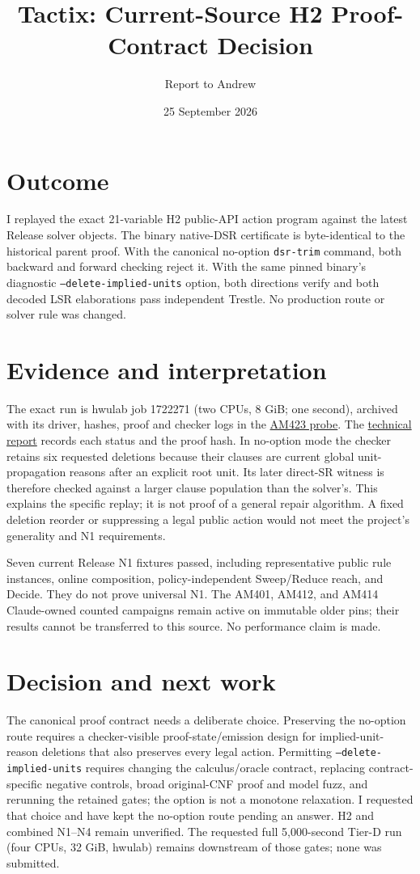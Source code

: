 \documentclass[11pt]{article}
\title{Tactix: Current-Source H2 Proof-Contract Decision}
\author{Report to Andrew}
\date{25 September 2026}
\begin{document}
\maketitle
\vspace{-1.5em}

\section*{Outcome}
I replayed the exact 21-variable H2 public-API action program against the
latest Release solver objects. The binary native-DSR certificate is
byte-identical to the historical parent proof. With the canonical no-option
\texttt{dsr-trim} command, both backward and forward checking reject it. With
the same pinned binary's diagnostic \texttt{--delete-implied-units} option,
both directions verify and both decoded LSR elaborations pass independent
Trestle. No production route or solver rule was changed.

\section*{Evidence and interpretation}
The exact run is hwulab job 1722271 (two CPUs, 8 GiB; one second), archived
with its driver, hashes, proof and checker logs in the
\href{../../benchmarks/probes/am423-h2-current/}{AM423 probe}. The
\href{../../benchmarks/reports/2026-09-25-am423-current-h2-proof-contract.md}{technical report}
records each status and the proof hash. In no-option mode the checker
retains six requested deletions because their clauses are current global
unit-propagation reasons after an explicit root unit. Its later direct-SR
witness is therefore checked against a larger clause population than the
solver's. This explains the specific replay; it is not proof of a general
repair algorithm. A fixed deletion reorder or suppressing a legal public
action would not meet the project's generality and N1 requirements.

Seven current Release N1 fixtures passed, including representative public
rule instances, online composition, policy-independent Sweep/Reduce reach,
and Decide. They do not prove universal N1. The AM401, AM412, and AM414
Claude-owned counted campaigns remain active on immutable older pins; their
results cannot be transferred to this source. No performance claim is made.

\section*{Decision and next work}
The canonical proof contract needs a deliberate choice. Preserving the
no-option route requires a checker-visible proof-state/emission design for
implied-unit-reason deletions that also preserves every legal action. Permitting
\texttt{--delete-implied-units} requires changing the calculus/oracle contract,
replacing contract-specific negative controls, broad original-CNF proof and
model fuzz, and rerunning the retained gates; the option is not a monotone
relaxation. I requested that choice and have kept the no-option route pending
an answer. H2 and combined N1--N4 remain unverified. The requested full
5,000-second Tier-D run (four CPUs, 32 GiB, hwulab) remains downstream of
those gates; none was submitted.
\end{document}
